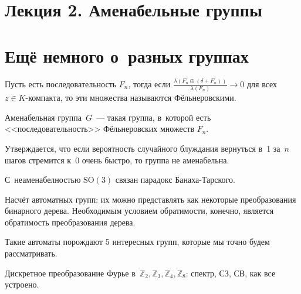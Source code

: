 \documentclass{article}
\begin{document}
\section*{Лекция 2. Аменабельные группы}
\resetcntrs

\section{Ещё немного о~разных группах}

\begin{definition}
	Пусть есть последовательность $F_n$, тогда если $\frac{\lambda(F_n \oplus
	(\delta + F_n))}{\lambda(F_n)} \rightarrow 0$ для всех $z \in K$-компакта, то
	эти множества называются Фёльнеровскими.
\end{definition}

\begin{definition}
	Аменабельная группа~$G$~--- такая группа, в~которой есть
	<<последовательность>> Фёльнеровских множеств $F_n$.
\end{definition}

Утверждается, что если вероятность случайного блуждания вернуться в~1 за~$n$
шагов стремится к~0 очень быстро, то группа не аменабельна.

С~неаменабелностью $\text{SO}(3)$ связан парадокс Банаха-Тарского.

Насчёт автоматных групп: их можно представлять как некоторые преобразования
бинарного дерева. Необходимым условием обратимости, конечно, является
обратимость преобразования дерева.

Такие автоматы порождают 5 интересных групп, которые мы точно будем
рассматривать.

\begin{exercise}
	Дискретное преобразование Фурье в~$\mathbb{Z}_2, \mathbb{Z}_3, \mathbb{Z}_4,
	\mathbb{Z}_8$: спектр, СЗ, СВ, как все устроено.
\end{exercise}
\end{document}
